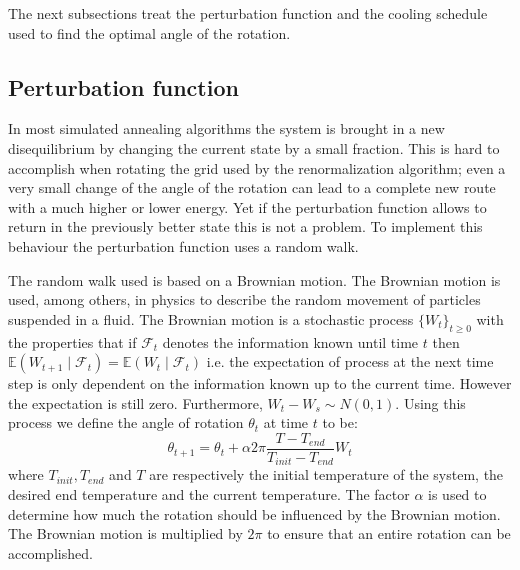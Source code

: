 The next subsections treat the perturbation function and the cooling schedule used
to find the optimal angle of the rotation.

\subsection{Perturbation function}
In most simulated annealing algorithms the system is brought in a new
disequilibrium by changing the current state by a small fraction. This is hard
to accomplish when rotating the grid used by the renormalization algorithm;
even a very small change of the angle of the rotation can lead to a complete
new route with a much higher or lower energy. Yet if the perturbation function
allows to return in the previously better state this is not a problem. To
implement this behaviour the perturbation function uses a random walk.

\newcommand{\expt}{\ensuremath{\mathbb{E}}}
The random walk used is based on a Brownian motion\cite{brown1829bam}. The
Brownian motion is used, among others, in physics to describe the random
movement of particles suspended in a fluid. The Brownian motion is
a stochastic process $\lbrace W_t\rbrace_{t\geq 0}$ with the properties that
if $\mathcal{F}_t$ denotes the information known until time $t$ then 
$\expt(W_{t + 1}\mid \mathcal{F}_t) = \expt(W_t \mid \mathcal{F}_t)$ i.e. the
expectation of process at the next time step is only dependent on the
information known up to the current time. However the expectation is still
zero. Furthermore, $W_t - W_s \sim N(0, 1)$. Using this process we define the
angle of rotation $\theta_t$ at time $t$ to be:
\begin{equation}\label{eq:rot}
\theta_{t + 1} = \theta_{t} + \alpha 2\pi\frac{T - T_{end}}
	{T_{init} - T_{end}}W_t
\end{equation}
where $T_{init}, T_{end}$ and $T$ are respectively the initial temperature of
the system, the desired end temperature and the current temperature. The
factor $\alpha$ is used to determine how much the rotation should be influenced
by the Brownian motion. The Brownian motion is multiplied by $2\pi$ to ensure
that an entire rotation can be accomplished.

